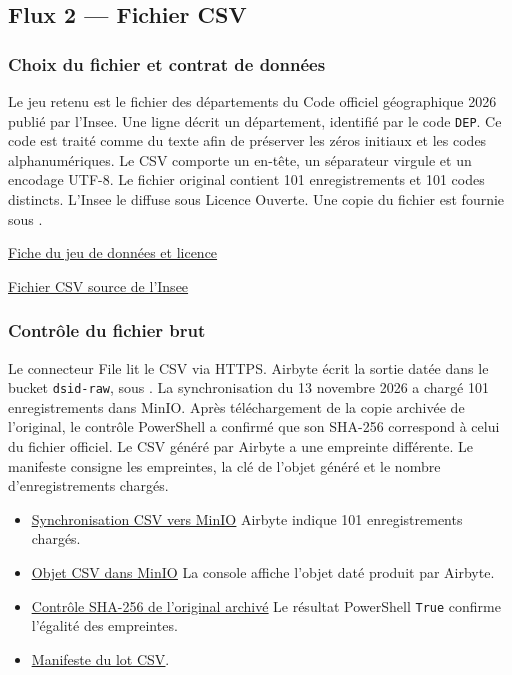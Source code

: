 \documentclass[11pt,a4paper]{article}
\newcommand{\code}[1]{\texttt{#1}}
\newcommand{\preuve}[2]{%
  \href{https://github.com/MAHDIghr/projet_big_data_starter/blob/27cc8348f6737a75bb24a40d6d8cda3ae54996b3/preuves/#1}{\textcolor{encre}{\underline{#2}}}}
\newcommand{\manifeste}[2]{%
  \href{https://github.com/MAHDIghr/projet_big_data_starter/blob/27cc8348f6737a75bb24a40d6d8cda3ae54996b3/data/manifestes/#1}{\textcolor{encre}{\underline{#2}}}}
\begin{document}
\subsection{Flux 2 --- Fichier CSV}

\subsubsection{Choix du fichier et contrat de données}

Le jeu retenu est le fichier des départements du Code officiel
géographique 2026 publié par l'Insee. Une ligne décrit un département,
identifié par le code \code{DEP}. Ce code est traité comme du texte
afin de préserver les zéros initiaux et les codes alphanumériques.
Le CSV comporte un en-tête, un séparateur virgule et un encodage UTF-8.
Le fichier original contient 101 enregistrements et 101 codes
distincts. L'Insee le diffuse sous Licence Ouverte.
Une copie du fichier est fournie sous .

\href{https://www.data.gouv.fr/datasets/code-officiel-geographique-1}{Fiche du jeu de données et licence}

\href{https://www.insee.fr/fr/statistiques/fichier/8740222/v_departement_2026.csv}{Fichier CSV source de l'Insee}

\subsubsection{Contrôle du fichier brut}

Le connecteur File lit le CSV via HTTPS. Airbyte écrit la sortie datée
dans le bucket \code{dsid-raw}, sous .
La synchronisation du 13 novembre 2026 a chargé 101 enregistrements
dans MinIO. Après téléchargement de la copie archivée de l'original,
le contrôle PowerShell a confirmé que son SHA-256 correspond à celui
du fichier officiel. Le CSV généré par Airbyte a une empreinte
différente. Le manifeste consigne les empreintes, la clé de l'objet
généré et le nombre d'enregistrements chargés.

\begin{itemize}
  \item \preuve{csv/csv_01_departements_sync_minio.png}{Synchronisation CSV vers MinIO}
        \enspace Airbyte indique 101 enregistrements chargés.
  \item \preuve{csv/csv_02_departements_objet_minio.png}{Objet CSV dans MinIO}
        \enspace La console affiche l'objet daté produit par Airbyte.
  \item \preuve{csv/csv_03_departements_sha256.txt}{Contrôle SHA-256 de l'original archivé}
        \enspace Le résultat PowerShell \code{True} confirme l'égalité des empreintes.
  \item \manifeste{csv_departements_2026.json}{Manifeste du lot CSV}.
\end{itemize}
\end{document}
